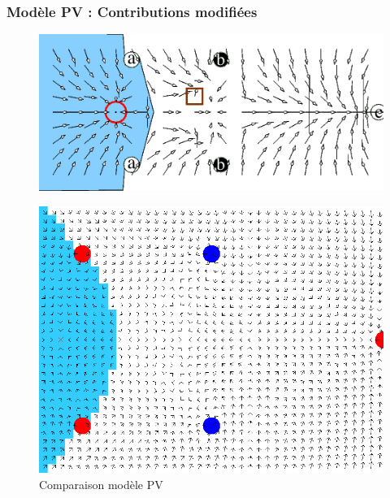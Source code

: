 \documentclass{beamer}
\begin{document}
\begin{frame}
  \frametitle{Modèle PV : Contributions modifiées}
  \begin{figure}
    \centering
    \includegraphics[scale=0.3]{pv_article.png}
  \end{figure}
  \begin{figure}
    \centering
    \includegraphics[scale=0.15]{pv2_res.png}
    \caption{Comparaison modèle PV}
  \end{figure}  
\end{frame}
\end{document}
